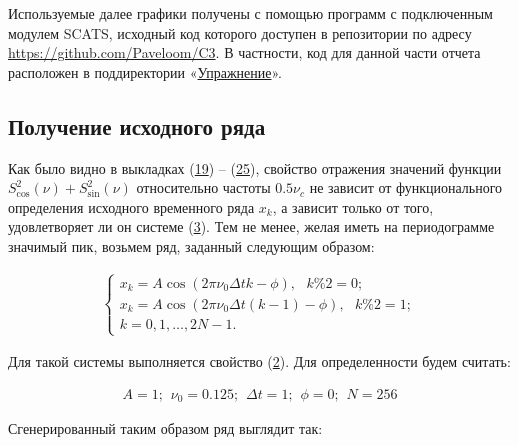 \documentclass[12pt]{article}
\newcommand{\hl}[1]{(\hyperlink{eq:#1}{#1})}
\newcommand{\sd}[1]{\hypertarget{skip:#1}{\vspace{-10pt}}}
\newcommand{\hep}[2]{\vspace{#2pt}\hypertarget{eq:#1}{}\vspace{-#2pt}}
\newcommand{\hs}[1]{\sd{#1}\hep{#1}{18}}
\newcommand{\hst}[1]{\sd{#1}\hep{#1}{22}}
\begin{document}
Используемые далее графики получены с помощью программ с подключенным модулем SCATS, исходный код которого доступен в репозитории по адресу \\ \href{https://github.com/Paveloom/C3}{https://github.com/Paveloom/C3}. В частности, код для данной части отчета расположен в поддиректории «\href{https://github.com/Paveloom/C3/tree/master/%D0%A3%D0%BF%D1%80%D0%B0%D0%B6%D0%BD%D0%B5%D0%BD%D0%B8%D0%B5}{Упражнение}».

\subsection{Получение исходного ряда}

Как было видно в выкладках \hl{19} -- \hl{25}, свойство отражения значений функции $ S_{\cos}^2(\nu) + S_{\sin}^2(\nu) $ относительно частоты $ 0.5 \nu_{c} $ не зависит от функционального определения исходного временного ряда $ x_{k} $, а зависит только от того, удовлетворяет ли он системе \hl{3}. Тем не менее, желая иметь на периодограмме значимый пик, возьмем ряд, заданный следующим образом:

\hs{27}
\begin{gather}
    \begin{cases}
        x_k = A \cos(2 \pi \nu_{0} \Delta t k - \phi) , \hspace{8pt} k \% 2 = 0; \\
        x_k = A \cos(2 \pi \nu_{0} \Delta t (k - 1) - \phi) , \hspace{8pt} k \% 2 = 1; \\
        k = 0, 1, \ldots, 2 N - 1.
    \end{cases}
\end{gather}

Для такой системы выполняется свойство \hl{2}. Для определенности будем считать:

\hst{28}
\begin{gather}
    A = 1; \hspace{5pt} \nu_{0} = 0.125; \hspace{5pt} \Delta t = 1; \hspace{5pt} \phi = 0; \hspace{5pt} N = 256
\end{gather}

Сгенерированный таким образом ряд выглядит так:
\end{document}
